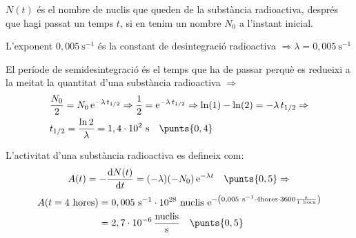 \begin{solapartat}
$N(t)$ és el nombre de nuclis que queden de la substància radioactiva, després que hagi passat un temps $t$, si en tenim un nombre $N_0$ a l'instant inicial. 

L'exponent $0,005\ \mathrm{s^{-1}}$ és la constant de desintegració radioactiva $\Rightarrow \lambda = 0,005\ \mathrm{s^{-1}}$ \quad{}

El període de semidesintegració és el temps que ha de passar perquè es redueixi a la meitat la quantitat d'una substància radioactiva  $\Rightarrow$
\begin{align*}
&\frac{N_0}{2} = N_0\,\mathrm{e}^{-\lambda\, t_{1/2}} \Rightarrow \frac{1}{2} = \mathrm{e}^{-\lambda\, t_{1/2}} \Rightarrow \ln(1) - \ln(2) = -\lambda\, t_{1/2} \Rightarrow\\
&t_{1/2} = \frac{\ln 2}{\lambda} = 1,4\cdot 10^{2}\ \mathrm{s} \quad\punts{0,4}
\end{align*}
\end{solapartat}

\begin{solapartat}
L'activitat d'una substància radioactiva es defineix com:
\[ A(t) = -\frac{\mathrm{d}N(t)}{\mathrm{d}t} = (-\lambda)(-N_0)\,\mathrm{e}^{-\lambda t} \quad\punts{0,5} \Rightarrow \]
\begin{align*}
A(t = 4\ \text{hores}) &= 0,005\ \mathrm{s^{-1}}\cdot 10^{28}\ \text{nuclis}\ \mathrm{e}^{-\left(0,005\ \mathrm{s^{-1}}\cdot 4\text{hores}\cdot 3600\frac{\mathrm{s}}{1\ \text{hora}}\right)}\\
&= 2,7\cdot 10^{-6}\,\frac{\text{nuclis}}{\mathrm{s}} \quad\punts{0,5}
\end{align*}
\end{solapartat}
